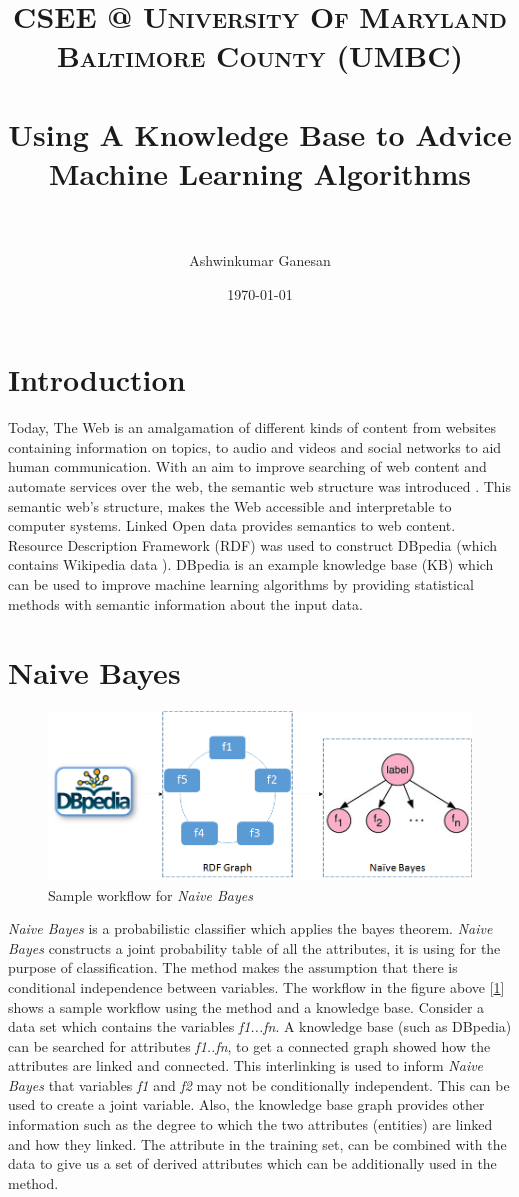 \documentclass[paper=a4, fontsize=11pt]{scrartcl}
\title{	
\normalfont \normalsize 
\textsc{CSEE @ University Of Maryland Baltimore County (UMBC)} \\ [25pt]
\horrule{0.5pt} \\[0.4cm]
\huge Using A Knowledge Base to Advice Machine Learning Algorithms\\
\horrule{2pt} \\[0.5cm] %
}
\author{Ashwinkumar Ganesan}
\date{\normalsize\today}
\numberwithin{equation}{section}
\numberwithin{figure}{section}
\numberwithin{table}{section}
\begin{document}
\maketitle

\section{Introduction}
Today, The Web is an amalgamation of different kinds of content from websites containing information on topics, to audio and videos and social networks to aid human communication. With an aim to improve searching of web content and automate services over the web, the semantic web structure was introduced \cite{berners2001semantic}. This semantic web's structure, makes the Web accessible and interpretable to computer systems. Linked Open data provides semantics to web content. Resource Description Framework (RDF) was used to construct DBpedia \cite{auer2007dbpedia} (which contains Wikipedia data \cite{Wiki}). DBpedia is an example knowledge base (KB) which can be used to improve machine learning algorithms by providing statistical methods with semantic information about the input data.

\section{Naive Bayes}
\begin{figure}[h]
	\includegraphics[width=\textwidth]{workflow.png}
	\caption{Sample workflow for \textit{Naive Bayes}}
	\label{nb}
\end{figure}

\textit{Naive Bayes} is a probabilistic classifier which applies the bayes theorem. \textit{Naive Bayes} constructs a joint probability table of all the attributes, it is using for the purpose of classification. The method makes the assumption that there is conditional independence between variables. The workflow in the figure above [\ref{nb}]  shows a sample workflow using the method and a knowledge base. Consider a data set which contains the variables \textit{f1...fn}. A knowledge base (such as DBpedia) can be searched for attributes \textit{f1..fn}, to get a connected graph showed how the attributes are linked and connected. This interlinking is used to inform \textit{Naive Bayes} that variables \textit{f1} and \textit{f2} may not be conditionally independent. This can be used to create a joint variable.
Also, the knowledge base graph provides other information such as the degree to which the two attributes (entities) are linked and how they linked. The attribute in the training set, can be combined with the data to give us a set of derived attributes which can be additionally used in the method.
\end{document}
